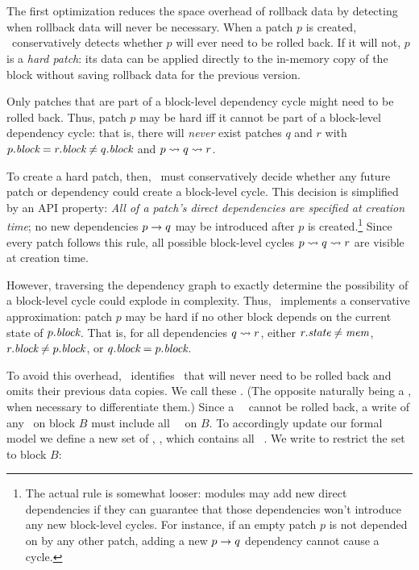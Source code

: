 \subsection{\Nrb\ \ChDescs}
\label{sec:chdescs:nrb}

The first optimization reduces the space overhead of rollback data by
detecting when rollback data will never be necessary.
%
When a patch $p$ is created, \Kudos\ conservatively detects whether $p$
will ever need to be rolled back.
%
If it will not, $p$ is a \emph{hard patch}: its data can be applied
directly to the in-memory copy of the block without saving rollback data
for the previous version.


Only patches that are part of a block-level dependency cycle might need to
be rolled back.
%
Thus, patch $p$ may be hard iff it cannot be part of a block-level
dependency cycle: that is, there will \emph{never} exist patches $q$ and
$r$ with $p.\textit{block} = r.\textit{block} \neq q.\textit{block}$ and $p \leadsto q
\leadsto r$.


To create a hard patch, then, \Kudos\ must conservatively decide whether
any future patch or dependency could create a block-level cycle.
%
This decision is simplified by an API property: \emph{All of a patch's
direct dependencies are specified at creation time};
%
no new dependencies $p \rightarrow q$ may be introduced after $p$ is
created.\footnote{The actual rule is somewhat looser: modules may add new
direct dependencies if they can guarantee that those dependencies won't
introduce any new block-level cycles.  For instance, if an empty patch $p$
is not depended on by any other patch, adding a new $p \rightarrow q$
dependency cannot cause a cycle.}
%
Since every patch follows this rule, all possible block-level cycles $p
\leadsto q \leadsto r$ are visible at creation time.


However, traversing the dependency graph to exactly determine the
possibility of a block-level cycle could explode in complexity.
%
Thus, \Kudos\ implements a conservative approximation: patch $p$ may be
hard if no other block depends on the current state of $p.\textit{block}$.
%
That is, for all dependencies $q \leadsto r$, either $r.\textit{state} \neq
\textit{mem}$, $r.\textit{block} \neq p.\textit{block}$, or $q.\textit{block} = p.\textit{block}$.


\begin{compactitemize}
\item 
\end{compactitemize}


%
To avoid this overhead, \Kudos\ identifies \chdescs\ that will never
need to be rolled back and omits their previous data copies. We call
these \emph{\nrb} \chdescs. (The opposite naturally being a \emph{\rb}
\chdesc, when necessary to differentiate them.)
%
Since a \nrb\ \chdesc\ cannot be rolled back, a write of any \chdescs\
on block $B$ must include all \nrb\ \chdescs\ on $B$. To accordingly
update our formal model we define a new set of \chdescs, \PHard, which
contains all \nrb\ \chdescs. We write \PHard[B] to restrict the set
to block $B$\todo{Introduce \PSoft\ and \PSoft[B].}:

